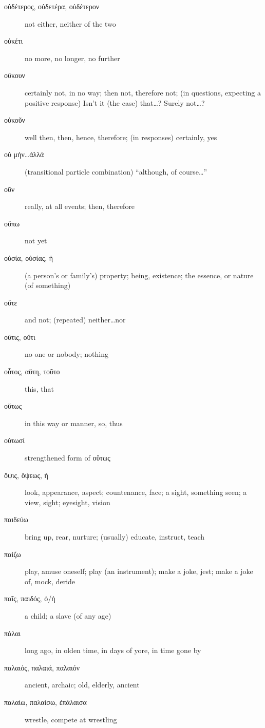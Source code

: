\documentclass[12pt,letterpaper]{article}
\begin{document}
\begin{description}
    \item[\textgreek{οὐδέτερος, οὐδετέρα, οὐδέτερον}] not either, neither of the two
    \item[\textgreek{οὐκέτι}] \marginnote{*}no more, no longer, no further
    \item[\textgreek{οὔκουν}] certainly not, in no way; then not, therefore not; (in questions, expecting a positive response) Isn't it (the case) that\dots ? Surely not\dots ?
    \item[\textgreek{οὐκοῦν}] \marginnote{*}well then, then, hence, therefore; (in responses) certainly, yes
    \item[\textgreek{οὐ μήν\dots ἀλλά}] (transitional particle combination) ``although, of course\dots ''
    \item[\textgreek{οῦν}] \marginnote{*}really, at all events; then, therefore
    \item[\textgreek{οὔπω}] not yet
    \item[\textgreek{οὐσία, οὐσίας, ἡ}] \marginnote{*}(a person's or family's) property; being, existence; the essence, or nature (of something)
    \item[\textgreek{οὔτε}] \marginnote{*}and not; (repeated) neither\dots nor
    \item[\textgreek{οὔτις, οὔτι}] no one or nobody; nothing
    \item[\textgreek{οὗτος, αὕτη, τοῦτο}] \marginnote{*}this, that
    \item[\textgreek{οὕτως}] \marginnote{*}in this way or manner, so, thus
    \item[\textgreek{οὑτωσί}] \marginnote{*}strengthened form of \textgreek{οὕτως}
    \item[\textgreek{ὄψις, ὄψεως, ἡ}] look, appearance, aspect; countenance, face; a sight, something seen; a view, sight; eyesight, vision
    \item[\textgreek{παιδεύω}] bring up, rear, nurture; (usually) educate, instruct, teach
    \item[\textgreek{παίζω}] play, amuse oneself; play (an instrument); make a joke, jest; make a joke of, mock, deride
    \item[\textgreek{παῖς, παιδός, ὁ/ἡ}] \marginnote{*}a child; a slave (of any age)
    \item[\textgreek{πάλαι}] long ago, in olden time, in days of yore, in time gone by
    \item[\textgreek{παλαιός, παλαιά, παλαιόν}] \marginnote{*}ancient, archaic; old, elderly, ancient
    \item[\textgreek{παλαίω, παλαίσω, ἐπάλαισα}] wrestle, compete at wrestling

\end{description}
\end{document}
